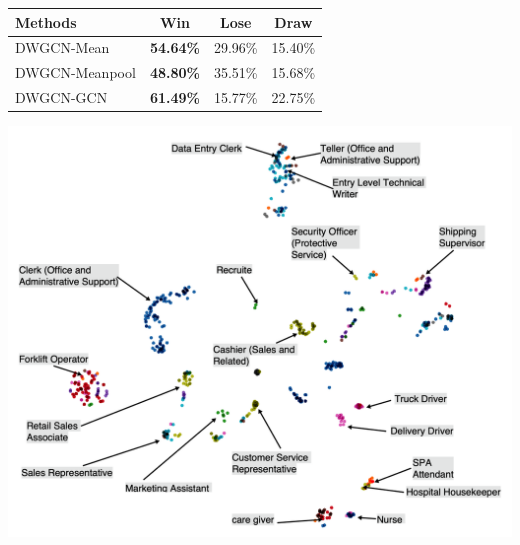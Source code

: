 \documentclass[manuscript,screen,review]{acmart}
\begin{document}

\vspace{0em}
   \begin{minipage}{\textwidth}
     \begin{minipage}[b]{0.45\textwidth}
    \centering
  \begin{tabular}[b]{lccc}
    \toprule
    Methods & Win & Lose & Draw \\
    \midrule
    DWGCN-Mean& \textbf{54.64\%} & 29.96\% & 15.40\%\\
    DWGCN-Meanpool& \textbf{48.80\%} & 35.51\% & 15.68\%\\
    DWGCN-GCN & \textbf{61.49\%} & 15.77\% & 22.75\%\\
  \bottomrule
\end{tabular}
      \label{tab:comp}
      \vspace{5em}
    \end{minipage}
    \hfill
  \begin{minipage}[b]{0.49\textwidth}
    \centering
    \includegraphics[width=\textwidth]{data_vis3.png}
    \label{fig:data_vis}
  \end{minipage}
  \end{minipage}
\end{document}
